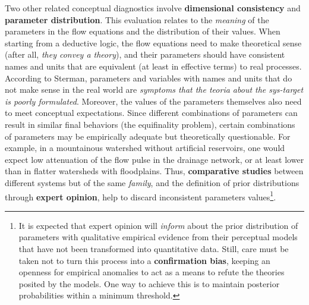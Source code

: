\documentclass[./main_en.tex]{subfiles}
\begin{document}
\par Two other related conceptual diagnostics involve \textbf{dimensional consistency} and \textbf{parameter distribution}. This evaluation relates to the \textit{meaning} of the \gls{parameters} in the flow equations and the distribution of their values. When starting from a deductive logic, the flow equations need to make theoretical sense (after all, \textit{they convey a theory}), and their \gls{parameters} should have consistent names and units that are equivalent (at least in effective terms) to real processes. According to Sterman, \gls{parameters} and variables with names and units that do not make sense in the real world are \textit{symptoms that the \gls{teoria} about the \gls{sys-target} is poorly formulated}. Moreover, the values of the \gls{parameters} themselves also need to meet conceptual expectations. Since different combinations of \gls{parameters} can result in similar final behaviors (the equifinality problem), certain combinations of \gls{parameters} may be empirically adequate but theoretically questionable. For example, in a mountainous watershed without artificial reservoirs, one would expect low attenuation of the flow pulse in the drainage network, or at least lower than in flatter watersheds with floodplains. Thus, \textbf{comparative studies} between different systems but of the same \textit{family}, and the definition of prior distributions through \textbf{expert opinion}, help to discard inconsistent \gls{parameters} values\footnote{It is expected that expert opinion will \textit{inform} about the prior distribution of \gls{parameters} with qualitative empirical evidence from their perceptual models that have not been transformed into quantitative data. Still, care must be taken not to turn this process into a \textbf{confirmation bias}, keeping an openness for empirical anomalies to act as a means to refute the theories posited by the models. One way to achieve this is to maintain posterior probabilities within a minimum threshold.}.
\end{document}
